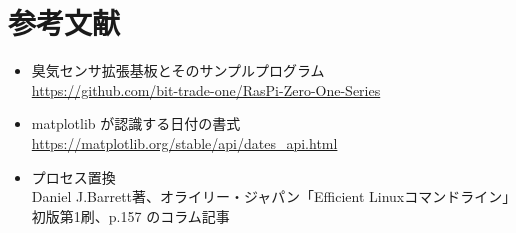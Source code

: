 \documentclass[12pt,a4paper,uplatex]{jsarticle}
\begin{document}
\newpage

\section{参考文献}

\begin{itemize}
	\item 臭気センサ拡張基板とそのサンプルプログラム\\
	\url{https://github.com/bit-trade-one/RasPi-Zero-One-Series}
	\item matplotlib が認識する日付の書式\\
	\url{https://matplotlib.org/stable/api/dates_api.html}
	\item プロセス置換\\
	Daniel J.Barrett著、オライリー・ジャパン「Efficient Linuxコマンドライン」初版第1刷、p.157 のコラム記事
\end{itemize}
\end{document}
